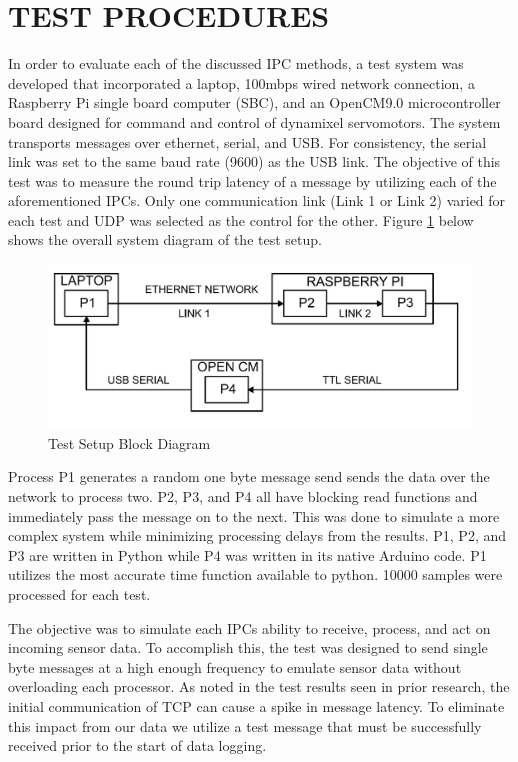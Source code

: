 \section{TEST PROCEDURES}

In order to evaluate each of the discussed IPC methods, a test system was developed that incorporated a laptop, 100mbps wired network connection, a Raspberry Pi single board computer (SBC), and an OpenCM9.0 microcontroller board designed for command and control of dynamixel servomotors. The system transports messages over ethernet, serial, and USB. For consistency, the serial link was set to the same baud rate (9600) as the USB link. The objective of this test was to measure the round trip latency of a message by utilizing each of the aforementioned IPCs. Only one communication link (Link 1 or Link 2) varied for each test and UDP was selected as the control for the other. Figure \ref{fig:test block diag} below shows the overall system diagram of the test setup. 

\begin{figure}[thpb]
 \centering
 \includegraphics[width=1.0\columnwidth]{./images/testblock.png}
  \caption{Test Setup Block Diagram}
  \label{fig:test block diag}
\end{figure} 

Process P1 generates a random one byte message send sends the data over the network to process two. P2, P3, and P4 all have blocking read functions and immediately pass the message on to the next. This was done to simulate a more complex system while minimizing processing delays from the results. P1, P2, and P3 are written in Python while P4 was written in its native Arduino code. P1 utilizes the most accurate time function available to python. 10000 samples were processed for each test.

The objective was to simulate each IPCs ability to receive, process, and act on incoming sensor data. To accomplish this, the test was designed to send single byte messages at a high enough frequency to emulate sensor data without overloading each processor. As noted in the test results seen in prior research\cite{REALTIMEACH}, the initial communication of TCP can cause a spike in message latency. To eliminate this impact from our data we utilize a test message that must be successfully received prior to the start of data logging. 
